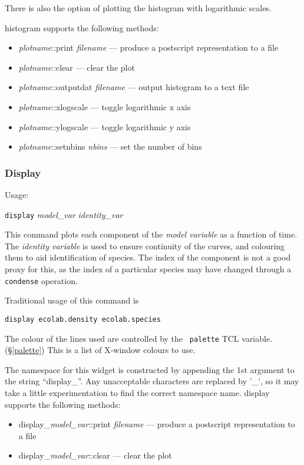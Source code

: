 There is also the option of plotting the histogram with logarithmic scales.

histogram supports the following methods:
\begin{itemize}
\item {\em plotname}::print {\em filename} --- produce a postscript
  representation to a file
\item {\em  plotname}::clear --- clear the plot
\item {\em  plotname}::outputdat {\em filename} --- output histogram
  to a text file
\item {\em  plotname}::xlogscale --- toggle logarithmic x axis
\item {\em  plotname}::ylogscale --- toggle logarithmic y axis
\item {\em  plotname}::setnbins {\em nbins} --- set the number of bins
\end{itemize}

\subsubsection{Display}\label{display}

Usage:

{\tt display} {\em model\_var} {\em identity\_var}

This command plots each component of the {\em model variable} as a function
of time. The {\em identity variable} is used to ensure continuity of
the curves, and colouring them to aid identification of species. The
index of the component is not a good proxy for this, as the index of a
particular species may have changed through a {\tt condense}
operation. 

Traditional \EcoLab{} usage of this command is
\begin{verbatim}
display ecolab.density ecolab.species
\end{verbatim}

The colour of the lines used are controlled by the {\tt
  palette} TCL variable.(\S\ref{palette}) This is a list of X-window
colours to use.

The namespace for this widget is constructed by appending the 1st
argument to the string ``display\_''. Any unacceptable characters are
replaced by '\_', so it may take a little experimentation to find the
correct namespace name.
display supports the following methods:
\begin{itemize}
\item display\_{\em model\_var}::print {\em filename} --- produce a postscript
  representation to a file
\item display\_{\em  model\_var}::clear --- clear the plot
\end{itemize}

